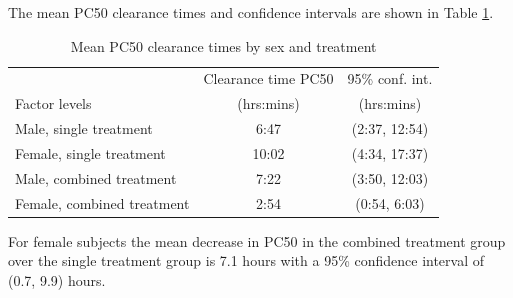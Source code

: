 The mean PC50 clearance times and confidence intervals are shown in Table \ref{inference50}.
\begin{table}[h]
\centering
\caption{Mean PC50 clearance times by sex and treatment}\label{inference50}
\begin{tabular}{|l|c|c|}
\hline
&Clearance time PC50&95\% conf. int.\\
Factor levels&(hrs:mins)&(hrs:mins)\\
\hline
Male, single treatment 		& 6:47 & (2:37, 12:54) \\
Female, single treatment		& 10:02 & (4:34,  17:37) \\
Male, combined treatment	& 7:22 & (3:50, 12:03) \\
Female, combined treatment	& 2:54 & (0:54, 6:03) \\
\hline
\end{tabular}
\end{table}

For female subjects the mean decrease in PC50 in the combined treatment group over the single treatment group is 7.1 hours with a 95\% confidence interval of (0.7, 9.9) hours.

